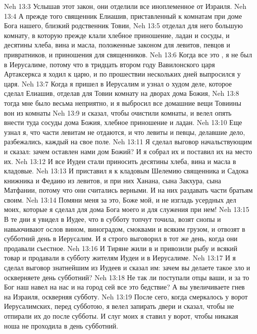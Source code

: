 \vs Neh 13:3 Услышав этот закон, они отделили все иноплеменное от Израиля.
\vs Neh 13:4 А прежде того священник Елиашив, приставленный к комнатам при доме Бога нашего, близкий родственник Товии,
\vs Neh 13:5 отделал для него большую комнату, в которую прежде клали хлебное приношение, ладан и сосуды, и десятины хлеба, вина и масла, положенные законом для левитов, певцов и привратников, и приношения для священников.
\vs Neh 13:6 Когда все это , я не был в Иерусалиме, потому что в тридцать втором году Вавилонского царя Артаксеркса я ходил к царю, и по прошествии нескольких дней  выпросился у царя.
\vs Neh 13:7 Когда я пришел в Иерусалим и узнал о худом деле, которое сделал Елиашив, отделав для Товии комнату на дворах дома Божия,
\vs Neh 13:8 тогда мне было весьма неприятно, и я выбросил все домашние вещи Товиины вон из комнаты
\vs Neh 13:9 и сказал, чтобы очистили комнаты, и велел опять внести туда сосуды дома Божия, хлебное приношение и ладан.
\vs Neh 13:10 Еще узнал я, что части левитам не отдаются, и что левиты и певцы, делавшие  дело, разбежались, каждый на свое поле.
\vs Neh 13:11 Я сделал  выговор начальствующим и сказал: зачем оставлен нами дом Божий? И я собрал их и поставил их на место их.
\vs Neh 13:12 И все Иудеи стали приносить десятины хлеба, вина и масла в кладовые.
\vs Neh 13:13 И приставил я к кладовым Шелемию священника и Садока книжника и Федаию из левитов, и при них Ханана, сына Закхура, сына Матфании, потому что они считались верными. И на них  раздавать части братьям своим.
\vs Neh 13:14 Помяни меня за это, Боже мой, и не изгладь усердных дел моих, которые я сделал для дома Бога моего и для служения при нем!
\rsbpar\vs Neh 13:15 В те дни я увидел в Иудее, что в субботу топчут точила, возят снопы и навьючивают ослов вином, виноградом, смоквами и всяким грузом, и отвозят в субботний день в Иерусалим. И я строго выговорил  в тот же день, когда они продавали съестное.
\vs Neh 13:16 И Тиряне жили в  и привозили рыбу и всякий товар и продавали в субботу жителям Иудеи и в Иерусалиме.
\vs Neh 13:17 И я сделал выговор знатнейшим из Иудеев и сказал им: зачем вы делаете такое зло и оскверняете день субботний?
\vs Neh 13:18 Не так ли поступали отцы ваши, и за то Бог наш навел на нас и на город сей все это бедствие? А вы увеличиваете гнев  на Израиля, оскверняя субботу.
\vs Neh 13:19 После сего, когда смеркалось у ворот Иерусалимских, перед субботою, я велел запирать двери и сказал, чтобы не отпирали их до  после субботы. И слуг моих я ставил у ворот, чтобы никакая ноша не проходила в день субботний.
